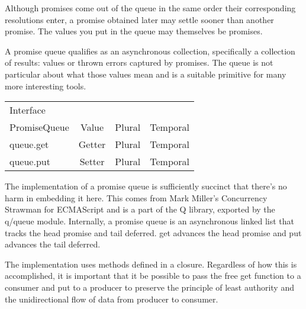 Although promises come out of the queue in the same order their corresponding resolutions enter, a promise obtained later may settle sooner than another promise. The values you put in the queue may themselves be promises.

A promise queue qualifies as an asynchronous collection, specifically a collection of results: values or thrown errors captured by promises. The queue is not particular about what those values mean and is a suitable primitive for many more interesting tools.
\begin{tabular}{| l | c | c | c |}
Interface & & & \\			
PromiseQueue	& Value	& Plural & Temporal\\
queue.get &	Getter	& Plural &	Temporal\\
queue.put &	Setter	& Plural &	Temporal\\
\end{tabular}

The implementation of a promise queue is sufficiently succinct that there’s no harm in embedding it here. This comes from Mark Miller's Concurrency Strawman for ECMAScript and is a part of the Q library, exported by the q/queue module. Internally, a promise queue is an asynchronous linked list that tracks the head promise and tail deferred. get advances the head promise and put advances the tail deferred.

The implementation uses methods defined in a closure. Regardless of how this is accomplished, it is important that it be possible to pass the free get function to a consumer and put to a producer to preserve the principle of least authority and the unidirectional flow of data from producer to consumer.


